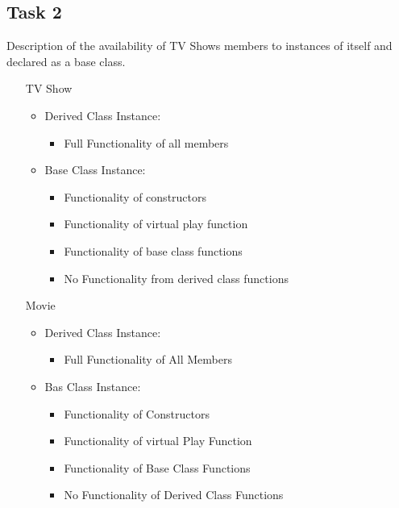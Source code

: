 \documentclass[10pt]{article}
\begin{document}
	\subsection{Task 2}
	Description of the availability of TV Shows members to instances of itself and  declared as a base class.
	\begin{itemize}
		\item [TV Show]
		\begin{itemize}
			\item Derived Class Instance: 
			\begin{itemize}
				\item Full Functionality of all members
			\end{itemize}
			\item Base Class Instance: 
			\begin{itemize}
				\item Functionality of constructors
				\item Functionality of virtual play function
				\item Functionality of base class functions
				\item No Functionality from derived class functions
			\end{itemize}
		\end{itemize}
		\item[Movie]
		\begin{itemize}
			\item Derived Class Instance:
			\begin{itemize}
				\item Full Functionality of All Members
			\end{itemize}
			\item Bas Class Instance:
			\begin{itemize}
				\item Functionality of Constructors
				\item Functionality of virtual Play Function
				\item Functionality of Base Class Functions
				\item No Functionality of Derived Class Functions
			\end{itemize}
		\end{itemize}
	\end{itemize}
\newpage
\end{document}
